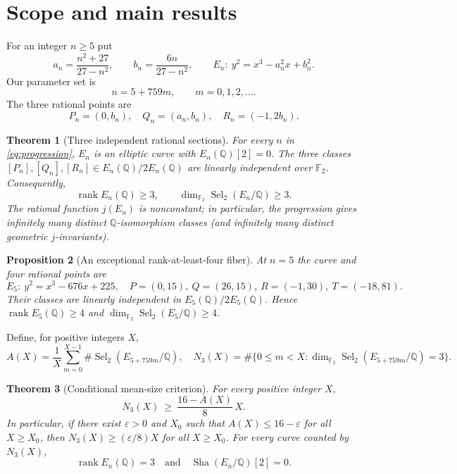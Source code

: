 \documentclass[11pt]{article}
\newtheorem{theorem}{Theorem}
\newtheorem{proposition}[theorem]{Proposition}
\newcommand{\Q}{\mathbb Q}
\newcommand{\F}{\mathbb F}
\newcommand{\Sel}{\operatorname{Sel}}
\newcommand{\Sha}{\mathop{\mathrm{Sha}}}
\newcommand{\rank}{\operatorname{rank}}
\begin{document}
\section{Scope and main results}\label{sec:main}

For an integer $n\ge5$ put
\begin{equation}\label{eq:params}
 a_n=\frac{n^2+27}{27-n^2},\qquad
 b_n=\frac{6n}{27-n^2},\qquad
 E_n:\ y^2=x^3-a_n^2x+b_n^2.
\end{equation}
Our parameter set is
\begin{equation}\label{eq:progression}
 n=5+759m,\qquad m=0,1,2,\ldots.
\end{equation}
The three rational points are
\begin{equation}\label{eq:points}
 P_n=(0,b_n),\quad Q_n=(a_n,b_n),\quad R_n=(-1,2b_n).
\end{equation}

\begin{theorem}[Three independent rational sections]\label{thm:three}
For every $n$ in \eqref{eq:progression}, $E_n$ is an elliptic curve
with $E_n(\Q)[2]=0$. The three classes
$[P_n],[Q_n],[R_n]\in E_n(\Q)/2E_n(\Q)$ are linearly independent
over $\F_2$. Consequently,
\[
 \rank E_n(\Q)\ge3,\qquad
 \dim_{\F_2}\Sel_2(E_n/\Q)\ge3.
\]
The rational function $j(E_n)$ is nonconstant; in particular, the
progression gives infinitely many distinct $\Q$-isomorphism classes
(and infinitely many distinct geometric $j$-invariants).
\end{theorem}

\begin{proposition}[An exceptional rank-at-least-four fiber]\label{prop:four}
At $n=5$ the curve and four rational points are
\[
 E_5:\ y^2=x^3-676x+225,
\quad P=(0,15),\ Q=(26,15),\ R=(-1,30),\ T=(-18,81).
\]
Their classes are linearly independent in $E_5(\Q)/2E_5(\Q)$.
Hence $\rank E_5(\Q)\ge4$ and
$\dim_{\F_2}\Sel_2(E_5/\Q)\ge4$.
\end{proposition}

Define, for positive integers $X$,
\begin{equation}\label{eq:averages}
 A(X)=\frac1X\sum_{m=0}^{X-1}
 \#\Sel_2(E_{5+759m}/\Q),
\quad
 N_3(X)=\#\{0\le m<X:\dim_{\F_2}\Sel_2(E_{5+759m}/\Q)=3\}.
\end{equation}

\begin{theorem}[Conditional mean-size criterion]\label{thm:mean}
For every positive integer $X$,
\[
 N_3(X)\ \ge\ \frac{16-A(X)}8\,X.
\]
In particular, if there exist $\varepsilon>0$ and $X_0$ such that
$A(X)\le16-\varepsilon$ for all $X\ge X_0$, then
$N_3(X)\ge(\varepsilon/8)X$ for all $X\ge X_0$.
For every curve counted by $N_3(X)$,
\[
 \rank E_n(\Q)=3\quad\text{and}\quad \Sha(E_n/\Q)[2]=0.
\]
\end{theorem}
\end{document}
